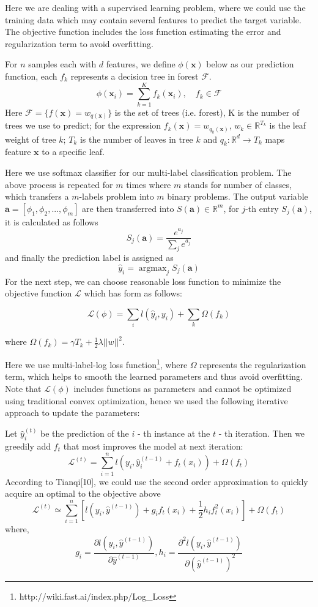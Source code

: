 \documentclass[letterpaper]{article}
\begin{document}
Here we are dealing with a supervised learning problem, where we could use the training data which may contain several features to predict the target variable. 
The objective function includes the loss function estimating the error and regularization term to avoid overfitting. 

For $n$ samples each with $d$ features, we define $\phi(\bm{x})$ below as our prediction function, each $f_k$ represents a decision tree in forest $\mathcal{F}$.
$$
\phi(\bm{x}_{i}) = \sum_{k = 1}^{K} f_{k}(\bm{x}_{i}),\quad f_{k} \in \mathcal{F}
$$
Here $\mathcal{F} = \{ f(\bm{x}) = w_{q(\bm{x})} \}$ is the set of trees (i.e. forest), K is the number of trees we use to predict; for the expression $f_{k}(\bm{x})=w_{q_{k}(\bm{x})}$, $w_{k}\in \mathbb{R}^{T_{k}}$ is the leaf weight of tree $k$; $T_{k}$ is the number of leaves in tree $k$ and $q_{k}: \mathbb{R}^d \rightarrow T_{k}$ maps feature $\bm{x}$ to a specific leaf.

Here we use softmax classifier for our multi-label classification problem. The above process is repeated for $m$ times where $m$ stands for number of classes, which transfers a $m$-labels problem into $m$ binary problems. The output variable $\bm{a}=[\phi_{1},\phi_{2},...,\phi_{m}]$ are then transferred into $S(\bm{a})\in\mathbb{R}^{m}$, for $j$-th entry $S_{j}(\bm{a})$, it is calculated as follows
$$
S_{j}(\bm{a}) = \frac{e^{a_{j}}}{\sum_{j}e^{a_{j}}}
$$
and finally the prediction label is assigned as
$$
\hat{y}_{i}=\mathop{\arg\max}_{j} S_{j}(\bm{a})
$$
For the next step, we can choose reasonable loss function to minimize the objective function $\mathcal{L}$ which has form as follows:

$$
\mathcal{L}(\phi) = \sum_{i} l(\hat y_i, y_i) + \sum_{k} \Omega(f_k)
$$

where $\Omega(f_{k}) = \gamma T_{k} + \frac{1}{2}\lambda ||w||^{2}$.

Here we use multi-label-log loss function\footnote{ http://wiki.fast.ai/index.php/Log\_Loss}, where $\Omega$ represents the regularization term, which helps to smooth the learned parameters and thus avoid overfitting. Note that $\mathcal{L}(\phi)$ includes functions as parameters and cannot be optimized using traditional convex optimization, hence we used the following iterative approach to update the parameters:

Let $\hat{y}_{i}^{(t)}$ be the prediction of the $i$ - th instance at the $t$ - th iteration. Then we greedily add $f_t$ that most improves the model at next iteration:
$$
\mathcal{L}^{(t)} = \sum_{i = 1}^nl(y_{i}, \hat{y}_{i}^{(t-1)} + f_{t}(x_i)) + \Omega(f_{t})
$$
According to Tianqi[10], we could use the second order approximation to quickly acquire an optimal to the objective above
$$
\mathcal{L}^{(t)} \simeq\sum_{i = 1}^n[l(y_i, \hat{y}^{(t-1)}) + g_if_t(x_i) + \frac{1}{2}h_if_t^2(x_i)] + \Omega(f_t)
$$
where, 
$$
g_i=\frac{\partial l(y_i, \hat{y}^{(t-1)})}{\partial\hat{y}^{(t-1)}},
h_i=\frac{\partial^2 l(y_i, \hat{y}^{(t-1)})}{\partial(\hat{y}^{(t-1)})^{2}}$$
\end{document}
